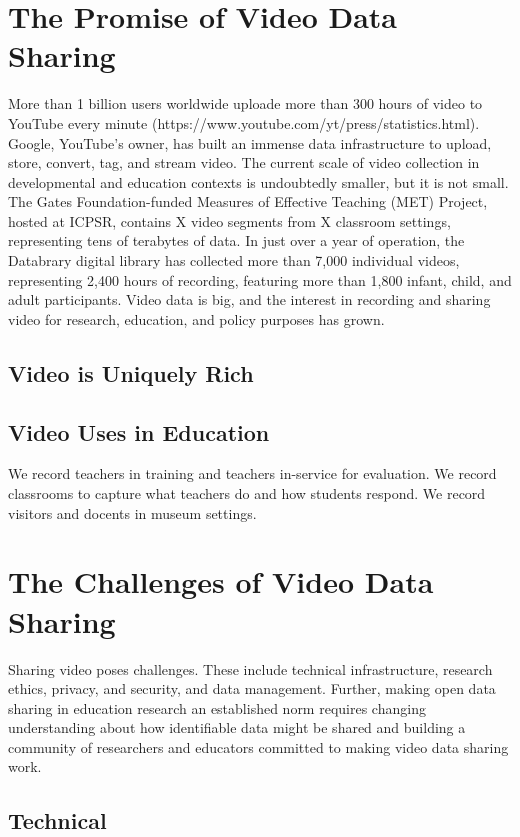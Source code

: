 \documentclass[letterpaper,man,natbib]{apa6}
\begin{document}
\section{The Promise of Video Data Sharing}

More than 1 billion users worldwide uploade more than 300 hours of video to YouTube every minute (https://www.youtube.com/yt/press/statistics.html). Google, YouTube's owner, has built an immense data infrastructure to upload, store, convert, tag, and stream video. The current scale of video collection in developmental and education contexts is undoubtedly smaller, but it is not small. The Gates Foundation-funded Measures of Effective Teaching (MET) Project, hosted at ICPSR, contains X video segments from X classroom settings, representing tens of terabytes of data. In just over a year of operation, the Databrary digital library has collected more than 7,000 individual videos, representing 2,400 hours of recording, featuring more than 1,800 infant, child, and adult participants. Video data is big, and the interest in recording and sharing video for research, education, and policy purposes has grown.

\subsection{Video is Uniquely Rich}

\subsection{Video Uses in Education}

We record teachers in training and teachers in-service for evaluation.
We record classrooms to capture what teachers do and how students respond.
We record visitors and docents in museum settings.
\section{The Challenges of Video Data Sharing}

Sharing video poses challenges. 
These include technical infrastructure, research ethics, privacy, and security, and data management. 
Further, making open data sharing in education research an established norm requires changing understanding about how identifiable data might be shared and building a community of researchers and educators committed to making video data sharing work.

\subsection{Technical}
\end{document}
